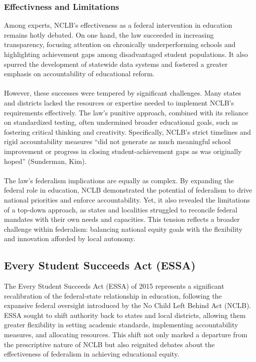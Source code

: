 \documentclass[11pt]{extarticle}
\begin{document}
\subsubsection{Effectivness and Limitations}
Among experts, NCLB’s effectiveness as a federal intervention in education remains hotly debated. On one hand, the law succeeded in increasing transparency, focusing attention on chronically underperforming schools and highlighting achievement gaps among disadvantaged student populations. It also spurred the development of statewide data systems and fostered a greater emphasis on accountability of educational reform.\\
\\
However, these successes were tempered by significant challenges. Many states and districts lacked the resources or expertise needed to implement NCLB’s requirements effectively. The law’s punitive approach, combined with its reliance on standardized testing, often undermined broader educational goals, such as fostering critical thinking and creativity. Specifically, NCLB’s strict timelines and rigid accountability measures “did not generate as much meaningful school improvement or progress in closing student-achievement gaps as was originally hoped” (Sunderman, Kim).\\
\\
The law’s federalism implications are equally as complex. By expanding the federal role in education, NCLB demonstrated the potential of federalism to drive national priorities and enforce accountability. Yet, it also revealed the limitations of a top-down approach, as states and localities struggled to reconcile federal mandates with their own needs and capacities. This tension reflects a broader challenge within federalism: balancing national equity goals with the flexibility and innovation afforded by local autonomy.





\subsection{Every Student Succeeds Act (ESSA)}
The Every Student Succeeds Act (ESSA) of 2015 represents a significant recalibration of the federal-state relationship in education, following the expansive federal oversight introduced by the No Child Left Behind Act (NCLB). ESSA sought to shift authority back to states and local districts, allowing them greater flexibility in setting academic standards, implementing accountability measures, and allocating resources. This shift not only marked a departure from the prescriptive nature of NCLB but also reignited debates about the effectiveness of federalism in achieving educational equity.
\end{document}
